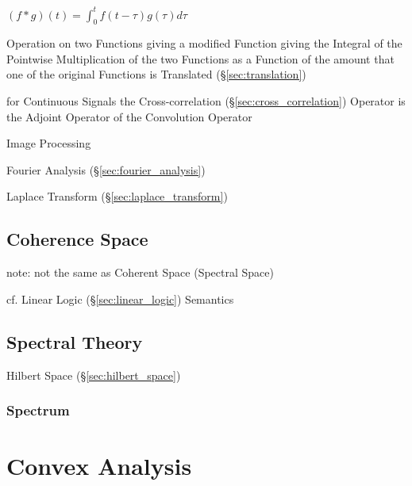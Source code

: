 $(f * g)(t) = \int_0^t f(t-\tau) g(\tau) d\tau$

Operation on two Functions giving a modified Function giving the Integral of
the Pointwise Multiplication of the two Functions as a Function of the amount
that one of the original Functions is Translated (\S\ref{sec:translation})

for Continuous Signals the Cross-correlation (\S\ref{sec:cross_correlation})
Operator is the Adjoint Operator of the Convolution Operator

Image Processing

\fist Fourier Analysis (\S\ref{sec:fourier_analysis})

Laplace Transform (\S\ref{sec:laplace_transform})



\subsection{Coherence Space}\label{sec:coherence_space}

note: not the same as Coherent Space (Spectral Space)

cf. Linear Logic (\S\ref{sec:linear_logic}) Semantics



\subsection{Spectral Theory}\label{sec:spectral_theory}

Hilbert Space (\S\ref{sec:hilbert_space})



\subsubsection{Spectrum}\label{sec:spectrum}



\section{Convex Analysis}\label{sec:convex_analysis}

